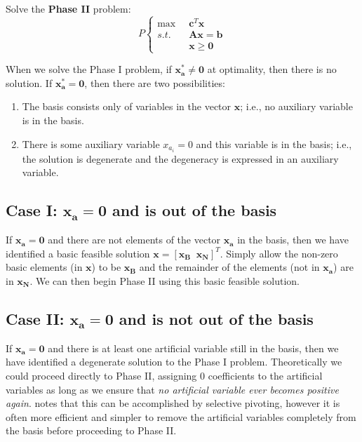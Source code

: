 \begin{algorithm}
\begin{center}
\begin{minipage}[t]{\textwidth-1em}
\begin{enumerate*}
\item Solve the \textbf{Phase II} problem:
\begin{displaymath}
P\left\{
\begin{aligned}
\max\;\; & \mathbf{c}^T\mathbf{x}\\
s.t.\;\; & \mathbf{A}\mathbf{x} = \mathbf{b}\\
& \mathbf{x} \geq \mathbf{0}
\end{aligned}\right.
\end{displaymath}
\end{enumerate*}
\end{minipage}
\end{center}
\end{algorithm}

When we solve the Phase I problem, if $\mathbf{x}_\mathbf{a}^* \neq \mathbf{0}$ at optimality, then there is no solution. If $\mathbf{x}_\mathbf{a}^* = \mathbf{0}$, then there are two possibilities: 
\begin{enumerate}
\item The basis consists only of variables in the vector $\mathbf{x}$; i.e., no auxiliary variable is in the basis.
\item There is some auxiliary variable $x_{a_i}=0$ and this variable is in the basis; i.e., the solution is degenerate and the degeneracy is expressed in an auxiliary variable.
\end{enumerate}

\subsection{Case I: $\mathbf{x}_\mathbf{a} = \mathbf{0}$ and is out of the basis}

If $\mathbf{x}_\mathbf{a} = \mathbf{0}$ and there are not elements of the vector $\mathbf{x}_\mathbf{a}$ in the basis, then we have identified a basic feasible solution $\mathbf{x} = [\mathbf{x}_\mathbf{B}\;\;\mathbf{x}_\mathbf{N}]^T$. Simply allow the non-zero basic elements (in $\mathbf{x}$) to be $\mathbf{x}_\mathbf{B}$ and the remainder of the elements (not in $\mathbf{x_a}$) are in $\mathbf{x}_\mathbf{N}$. We can then begin Phase II using this basic feasible solution.

\subsection{Case II: $\mathbf{x}_\mathbf{a} = \mathbf{0}$ and is not out of the basis}

If $\mathbf{x}_\mathbf{a} = \mathbf{0}$ and there is at least one artificial variable still in the basis, then we have identified a degenerate solution to the Phase I problem. Theoretically we could proceed directly to Phase II, assigning $0$ coefficients to the artificial variables as long as we ensure that \textit{no artificial variable ever becomes positive again}. \cite{BJS04} notes that this can be accomplished by selective pivoting, however it is often more efficient and simpler to remove the artificial variables completely from the basis before proceeding to Phase II. 

